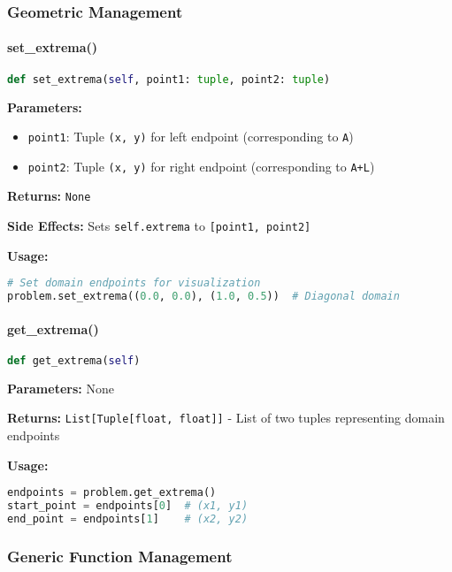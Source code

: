 \subsubsection{Geometric Management}

\paragraph{set\_extrema()}
\begin{lstlisting}[language=Python, caption=Set Extrema Method]
def set_extrema(self, point1: tuple, point2: tuple)
\end{lstlisting}

\textbf{Parameters:}
\begin{itemize}
    \item \texttt{point1}: Tuple \texttt{(x, y)} for left endpoint (corresponding to \texttt{A})
    \item \texttt{point2}: Tuple \texttt{(x, y)} for right endpoint (corresponding to \texttt{A+L})
\end{itemize}

\textbf{Returns:} \texttt{None}

\textbf{Side Effects:} Sets \texttt{self.extrema} to \texttt{[point1, point2]}

\textbf{Usage:}
\begin{lstlisting}[language=Python, caption=Set Extrema Usage]
# Set domain endpoints for visualization
problem.set_extrema((0.0, 0.0), (1.0, 0.5))  # Diagonal domain
\end{lstlisting}

\paragraph{get\_extrema()}
\begin{lstlisting}[language=Python, caption=Get Extrema Method]
def get_extrema(self)
\end{lstlisting}

\textbf{Parameters:} None

\textbf{Returns:} \texttt{List[Tuple[float, float]]} - List of two tuples representing domain endpoints

\textbf{Usage:}
\begin{lstlisting}[language=Python, caption=Get Extrema Usage]
endpoints = problem.get_extrema()
start_point = endpoints[0]  # (x1, y1)
end_point = endpoints[1]    # (x2, y2)
\end{lstlisting}

\subsubsection{Generic Function Management}

